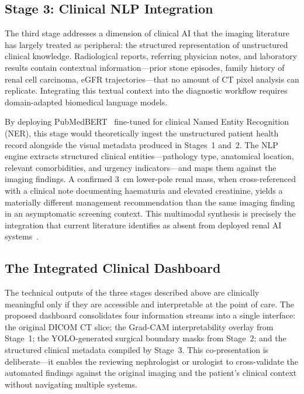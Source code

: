 \documentclass[pdflatex,sn-mathphys-num]{sn-jnl}%
\begin{document}
\subsection{Stage 3: Clinical NLP Integration}
\label{subsec:stage3_nlp}

The third stage addresses a dimension of clinical AI that the imaging literature has largely treated as peripheral: the structured representation of unstructured clinical knowledge. Radiological reports, referring physician notes, and laboratory results contain contextual information---prior stone episodes, family history of renal cell carcinoma, eGFR trajectories---that no amount of CT pixel analysis can replicate. Integrating this textual context into the diagnostic workflow requires domain-adapted biomedical language models.

By deploying PubMedBERT~\cite{gu2021domain} fine-tuned for clinical Named Entity Recognition (NER), this stage would theoretically ingest the unstructured patient health record alongside the visual metadata produced in Stages~1 and~2. The NLP engine extracts structured clinical entities---pathology type, anatomical location, relevant comorbidities, and urgency indicators---and maps them against the imaging findings. A confirmed 3~cm lower-pole renal mass, when cross-referenced with a clinical note documenting haematuria and elevated creatinine, yields a materially different management recommendation than the same imaging finding in an asymptomatic screening context. This multimodal synthesis is precisely the integration that current literature identifies as absent from deployed renal AI systems~\cite{sreenivas2025enhancing}.

\subsection{The Integrated Clinical Dashboard}
\label{subsec:unified_dashboard}

The technical outputs of the three stages described above are clinically meaningful only if they are accessible and interpretable at the point of care. The proposed dashboard consolidates four information streams into a single interface: the original DICOM CT slice; the Grad-CAM interpretability overlay from Stage~1; the YOLO-generated surgical boundary masks from Stage~2; and the structured clinical metadata compiled by Stage~3. This co-presentation is deliberate---it enables the reviewing nephrologist or urologist to cross-validate the automated findings against the original imaging and the patient's clinical context without navigating multiple systems.
\end{document}

